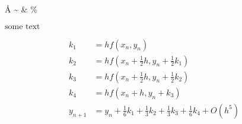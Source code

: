 \documentclass[12pt]{article}
\begin{document}
\AA{}   %
\infty  %
\sim    %
\approx %
\propto %
\equiv  %
\& \%   %
\pm     %

$\textrm{some\ text}$ %


\begin{align*}
k_1 &= hf(x_n,y_n)\\
k_2 &= hf(x_n+\frac{1}{2}h,y_n+\frac{1}{2}k_1)\\
k_3 &= hf(x_n+\frac{1}{2}h,y_n+\frac{1}{2}k_2)\\
k_4 &= hf(x_n+h,y_n+k_3)\\
y_{n+1} &=
y_n+\frac{1}{6}k_1+\frac{1}{3}k_2+\frac{1}{3}k_3+\frac{1}{6}k_4+O(h^5)\\
\end{align*}

\end{document}
